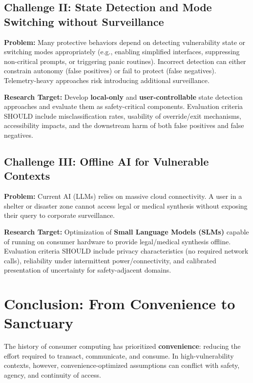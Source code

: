 \documentclass[12pt]{article}
\begin{document}
\subsection{Challenge II: State Detection and Mode Switching without Surveillance}
\textbf{Problem:} Many protective behaviors depend on detecting vulnerability state or switching modes appropriately (e.g., enabling simplified interfaces, suppressing non-critical prompts, or triggering panic routines). Incorrect detection can either constrain autonomy (false positives) or fail to protect (false negatives). Telemetry-heavy approaches risk introducing additional surveillance.

\textbf{Research Target:} Develop \textbf{local-only} and \textbf{user-controllable} state detection approaches and evaluate them as safety-critical components. Evaluation criteria SHOULD include misclassification rates, usability of override/exit mechanisms, accessibility impacts, and the downstream harm of both false positives and false negatives.

\subsection{Challenge III: Offline AI for Vulnerable Contexts}
\textbf{Problem:} Current AI (LLMs) relies on massive cloud connectivity. A user in a shelter or disaster zone cannot access legal or medical synthesis without exposing their query to corporate surveillance.

\textbf{Research Target:} Optimization of \textbf{Small Language Models (SLMs)} capable of running on consumer hardware to provide legal/medical synthesis offline. Evaluation criteria SHOULD include privacy characteristics (no required network calls), reliability under intermittent power/connectivity, and calibrated presentation of uncertainty for safety-adjacent domains.

\section{Conclusion: From Convenience to Sanctuary}

The history of consumer computing has prioritized \textbf{convenience}: reducing the effort required to transact, communicate, and consume. In high-vulnerability contexts, however, convenience-optimized assumptions can conflict with safety, agency, and continuity of access.
\end{document}
